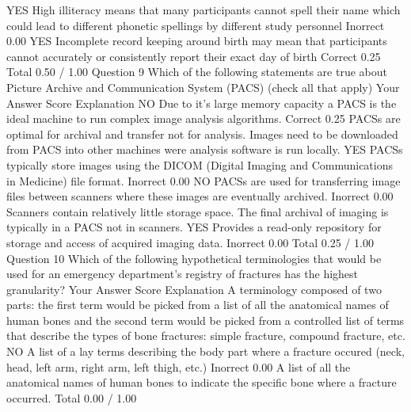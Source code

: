 YES High illiteracy means that many participants cannot spell their name which could lead to different phonetic spellings by different study personnel	Inorrect	0.00	
YES Incomplete record keeping around birth may mean that participants cannot accurately or consistently report their exact day of birth	Correct	0.25	
Total		0.50 / 1.00
Question 9
Which of the following statements are true about Picture Archive and Communication System (PACS) (check all that apply)
Your Answer		Score	Explanation
NO Due to it's large memory capacity a PACS is the ideal machine to run complex image analysis algorithms.	Correct	0.25	PACSs are optimal for archival and transfer not for analysis. Images need to be downloaded from PACS into other machines were analysis software is run locally.
YES PACSs typically store images using the DICOM (Digital Imaging and Communications in Medicine) file format.	Inorrect	0.00	
NO PACSs are used for transferring image files between scanners where these images are eventually archived.	Inorrect	0.00	Scanners contain relatively little storage space. The final archival of imaging is typically in a PACS not in scanners.
YES Provides a read-only repository for storage and access of acquired imaging data.	Inorrect	0.00	
Total		0.25 / 1.00	
Question 10
Which of the following hypothetical terminologies that would be used for an emergency department's registry of fractures has the highest granularity?
Your Answer		Score	Explanation
A terminology composed of two parts: the first term would be picked from a list of all the anatomical names of human bones and the second term would be picked from a controlled list of terms that describe the types of bone fractures: simple fracture, compound fracture, etc.			
NO A list of a lay terms describing the body part where a fracture occured (neck, head, left arm, right arm, left thigh, etc.)	Inorrect	0.00	
A list of all the anatomical names of human bones to indicate the specific bone where a fracture occurred.			
Total		0.00 / 1.00	




